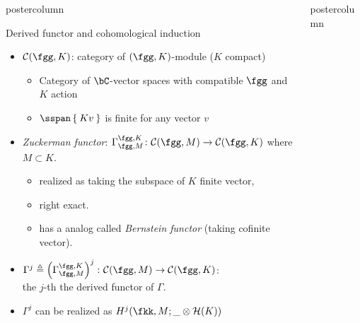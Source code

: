 \documentclass[final,hyperref={pdfpagelabels=false}]{beamer} %
\def\cC{\mathcal{C}}
\begin{document}
\begin{frame}
\begin{columns}
\begin{column}{.49\textwidth}
\begin{beamercolorbox}[center,wd=\textwidth]{postercolumn}
\begin{minipage}[T]{.95\textwidth}
{\begin{block}{Derived functor and cohomological induction}
  \begin{itemize}
     \item $\cC(\fgg,K)$: category of $(\fgg, K)$-module ($K$ compact)
      \begin{itemize}
      \item Category of $\bC$-vector spaces  with compatible $\fgg$ and $K$ action
      \item $\sspan\Set{Kv}$ is finite for any vector $v$  
      \end{itemize}
    \item {\em Zuckerman functor}: $\Gamma_{\fgg,M}^{\fgg,K}
      \colon \cC(\fgg,M)\to \cC(\fgg,K)$ 
      where $M\subset K$.
      \begin{itemize}
      \item realized as taking the subspace of $K$ finite vector,
      \item right exact.
      \item has a analog called {\em Bernstein functor} (taking cofinite vector).
      \end{itemize}
    \item $\Gamma^j\triangleq\left(\Gamma_{\fgg,M}^{\fgg,K}\right)^j
      \colon \cC(\fgg,M)\to \cC(\fgg,K)$:\\
      the $j$-th the derived functor of $\Gamma$.
    \item $\Gamma^j$ can be realized as $H^j(\fkk,M; \_ \otimes \mathcal{H}(K))$
    \end{itemize}
\end{block}

        }
        \end{minipage}
      \end{beamercolorbox}
\end{column}

 \begin{column}{.49\textwidth}

   \begin{beamercolorbox}[center,wd=\textwidth]{postercolumn}
        \begin{minipage}[T]{.95\textwidth}  %
          \parbox[t]{\textwidth}{ %
 
}
\end{minipage}
\end{beamercolorbox}
\end{column}
\end{columns}
\end{frame}
\end{document}
